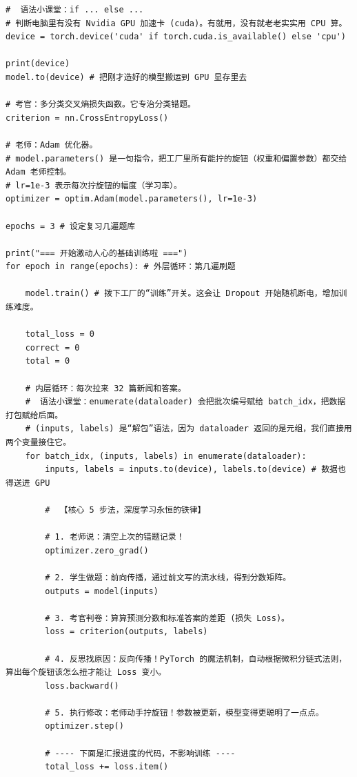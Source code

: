 \documentclass[10pt]{article}
\numberwithin{equation}{section}
\theoremstyle{plain}
\theoremstyle{definition}
\theoremstyle{remark}
\begin{document}
\begin{CodeBox}
	\begin{lstlisting}[style=PythonStyle]
#  语法小课堂：if ... else ... 
# 判断电脑里有没有 Nvidia GPU 加速卡 (cuda)。有就用，没有就老老实实用 CPU 算。
device = torch.device('cuda' if torch.cuda.is_available() else 'cpu')

print(device)
model.to(device) # 把刚才造好的模型搬运到 GPU 显存里去

# 考官：多分类交叉熵损失函数。它专治分类错题。
criterion = nn.CrossEntropyLoss()

# 老师：Adam 优化器。
# model.parameters() 是一句指令，把工厂里所有能拧的旋钮（权重和偏置参数）都交给 Adam 老师控制。
# lr=1e-3 表示每次拧旋钮的幅度（学习率）。
optimizer = optim.Adam(model.parameters(), lr=1e-3)

epochs = 3 # 设定复习几遍题库

print("=== 开始激动人心的基础训练啦 ===")
for epoch in range(epochs): # 外层循环：第几遍刷题
    
    model.train() # 拨下工厂的“训练”开关。这会让 Dropout 开始随机断电，增加训练难度。
    
    total_loss = 0 
    correct = 0    
    total = 0      
    
    # 内层循环：每次拉来 32 篇新闻和答案。
    #  语法小课堂：enumerate(dataloader) 会把批次编号赋给 batch_idx，把数据打包赋给后面。 
    # (inputs, labels) 是“解包”语法，因为 dataloader 返回的是元组，我们直接用两个变量接住它。
    for batch_idx, (inputs, labels) in enumerate(dataloader):
        inputs, labels = inputs.to(device), labels.to(device) # 数据也得送进 GPU
        
        #  【核心 5 步法，深度学习永恒的铁律】 
        
        # 1. 老师说：清空上次的错题记录！
        optimizer.zero_grad()
        
        # 2. 学生做题：前向传播，通过前文写的流水线，得到分数矩阵。
        outputs = model(inputs)
        
        # 3. 考官判卷：算算预测分数和标准答案的差距 (损失 Loss)。
        loss = criterion(outputs, labels)
        
        # 4. 反思找原因：反向传播！PyTorch 的魔法机制，自动根据微积分链式法则，算出每个旋钮该怎么扭才能让 Loss 变小。
        loss.backward()
        
        # 5. 执行修改：老师动手拧旋钮！参数被更新，模型变得更聪明了一点点。
        optimizer.step()
        
        # ---- 下面是汇报进度的代码，不影响训练 ----
        total_loss += loss.item() 
        

\end{lstlisting}
\end{CodeBox}
\end{document}
